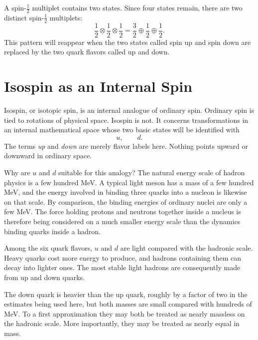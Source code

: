 A spin-\(\tfrac12\) multiplet contains two states. Since four states remain, there are two distinct spin-\(\tfrac12\) multiplets:
\begin{equation}
\frac12\otimes\frac12\otimes\frac12
=
\frac32\oplus\frac12\oplus\frac12.
\end{equation}
This pattern will reappear when the two states called spin up and spin down are replaced by the two quark flavors called up and down.

\section{Isospin as an Internal Spin}

Isospin, or isotopic spin, is an internal analogue of ordinary spin. Ordinary spin is tied to rotations of physical space. Isospin is not. It concerns transformations in an internal mathematical space whose two basic states will be identified with
\begin{equation}
u,\qquad d.
\end{equation}
The terms \emph{up} and \emph{down} are merely flavor labels here. Nothing points upward or downward in ordinary space.


Why are \(u\) and \(d\) suitable for this analogy? The natural energy scale of hadron physics is a few hundred MeV. A typical light meson has a mass of a few hundred MeV, and the energy involved in binding three quarks into a nucleon is likewise on that scale. By comparison, the binding energies of ordinary nuclei are only a few MeV. The force holding protons and neutrons together inside a nucleus is therefore being considered on a much smaller energy scale than the dynamics binding quarks inside a hadron.

Among the six quark flavors, \(u\) and \(d\) are light compared with the hadronic scale. Heavy quarks cost more energy to produce, and hadrons containing them can decay into lighter ones. The most stable light hadrons are consequently made from up and down quarks.

The down quark is heavier than the up quark, roughly by a factor of two in the estimates being used here, but both masses are small compared with hundreds of MeV. To a first approximation they may both be treated as nearly massless on the hadronic scale. More importantly, they may be treated as nearly equal in mass.

